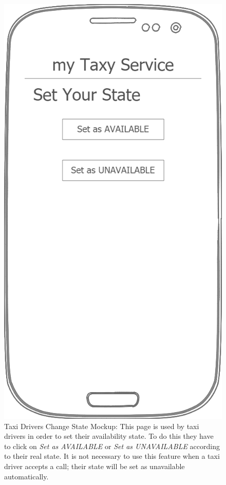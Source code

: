 \documentclass[a4paper]{article}
\begin{document}
\begin{figure}[H]
\includegraphics[width=\mockupWidth]{Mockup-TaxiDriversSetStatus}
\centering
\caption[Taxi Drivers Change State Mockup]{Taxi Drivers Change State Mockup: \newline This page is used by taxi drivers in order to set their availability state. To do this they have to click on \emph{Set as AVAILABLE} or \emph{Set as UNAVAILABLE} according to their real state. It is not necessary to use this feature when a taxi driver accepts a call; their state will be set as unavailable automatically.}
\label{fig:mockuptaxidriversetstatus}
\end{figure}
\end{document}
